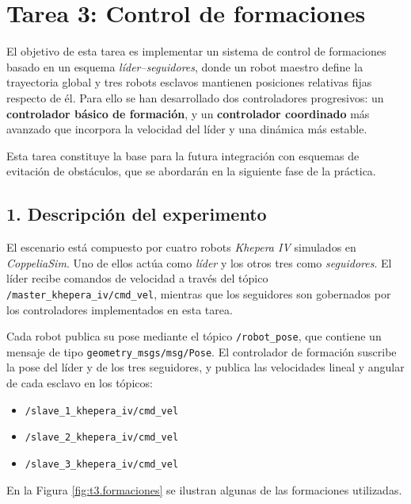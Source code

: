 \section*{Tarea 3: Control de formaciones}

El objetivo de esta tarea es implementar un sistema de control de formaciones
basado en un esquema \textit{líder--seguidores}, donde un robot maestro
define la trayectoria global y tres robots esclavos mantienen posiciones
relativas fijas respecto de él. Para ello se han desarrollado dos controladores
progresivos: un \textbf{controlador básico de formación}, y un
\textbf{controlador coordinado} más avanzado que incorpora la velocidad del líder
y una dinámica más estable.

Esta tarea constituye la base para la futura integración con esquemas de
evitación de obstáculos, que se abordarán en la siguiente fase de la práctica.

\subsection*{1. Descripción del experimento}

El escenario está compuesto por cuatro robots \textit{Khepera IV} simulados
en \textit{CoppeliaSim}. Uno de ellos actúa como \textit{líder} y los otros
tres como \textit{seguidores}. El líder recibe comandos de velocidad a través
del tópico \texttt{/master\_khepera\_iv/cmd\_vel}, mientras que los seguidores
son gobernados por los controladores implementados en esta tarea.

Cada robot publica su pose mediante el tópico
\texttt{/robot\_pose}, que contiene un mensaje de tipo
\texttt{geometry\_msgs/msg/Pose}. El controlador de formación suscribe
la pose del líder y de los tres seguidores, y publica las velocidades
lineal y angular de cada esclavo en los tópicos:

\begin{itemize}
    \item \texttt{/slave\_1\_khepera\_iv/cmd\_vel}
    \item \texttt{/slave\_2\_khepera\_iv/cmd\_vel}
    \item \texttt{/slave\_3\_khepera\_iv/cmd\_vel}
\end{itemize}

En la Figura \ref{fig:t3.formaciones} se ilustran algunas de las
formaciones utilizadas.

